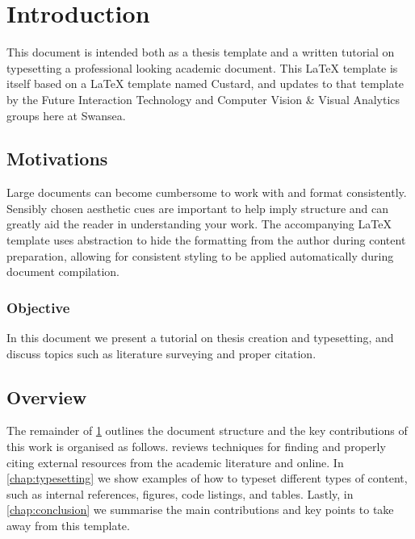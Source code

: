 \chapter{Introduction}
	\label{chap:intro}

This document is intended both as a thesis template and a written tutorial on typesetting a professional looking academic document.
This \LaTeX{} template is itself based on a \LaTeX{} template named Custard, and updates to that template by the Future Interaction Technology and Computer Vision \& Visual Analytics groups here at Swansea.


	\section{Motivations}
		\label{sec:intro_motivation} 

Large documents can become cumbersome to work with and format consistently.
Sensibly chosen aesthetic cues are important to help imply structure and can greatly aid the reader in understanding your work.
The accompanying \LaTeX{} template uses abstraction to hide the formatting from the author during content preparation, allowing for consistent styling to be applied automatically during document compilation.


	\subsection{Objective}
		\label{sec:intro_objective} 

In this document we present a tutorial on thesis creation and typesetting, and discuss topics such as literature surveying and proper citation. 


	\section{Overview}  
		\label{sec:intro_overview} 

The remainder of \cref{chap:intro} outlines the document structure and the key contributions of this work is organised as follows.
 reviews techniques for finding and properly citing external resources from the academic literature and online.
In \cref{chap:typesetting} we show examples of how to typeset different types of content, such as internal references, figures, code listings, and tables.
Lastly, in \cref{chap:conclusion} we summarise the main contributions and key points to take away from this template.


